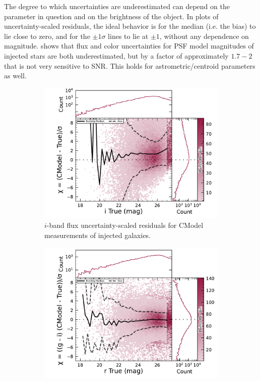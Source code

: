 The degree to which uncertainties are underestimated can depend on the parameter in question and on the brightness of the object.
In plots of uncertainty-scaled residuals, the ideal behavior is for the median (i.e. the bias) to lie close to zero, and for the $\pm1\sigma$ lines to lie at $\pm1$, without any dependence on magnitude.
 shows that flux and color uncertainties for PSF model magnitudes of injected stars are both underestimated, but by a factor of approximately $1.7-2$ that is not very sensitive to \gls{SNR}.
This holds for astrometric/centroid parameters as well.

\begin{figure}[hbt!]
  \centering
  \begin{subfigure}[t]{0.45\textwidth}
  \includegraphics[width=\linewidth]{injected_lsst_cells_v1_5063_i_mag_chi_cmodel}
  \caption{$i$-band flux uncertainty-scaled residuals for CModel measurements of injected galaxies.}
  \end{subfigure}\hfill
  \begin{subfigure}[t]{0.45\textwidth}
  \includegraphics[width=\linewidth]{injected_lsst_cells_v1_5063_r_color_chi_cmodel_g_minus_i}

\end{subfigure}
\end{figure}
